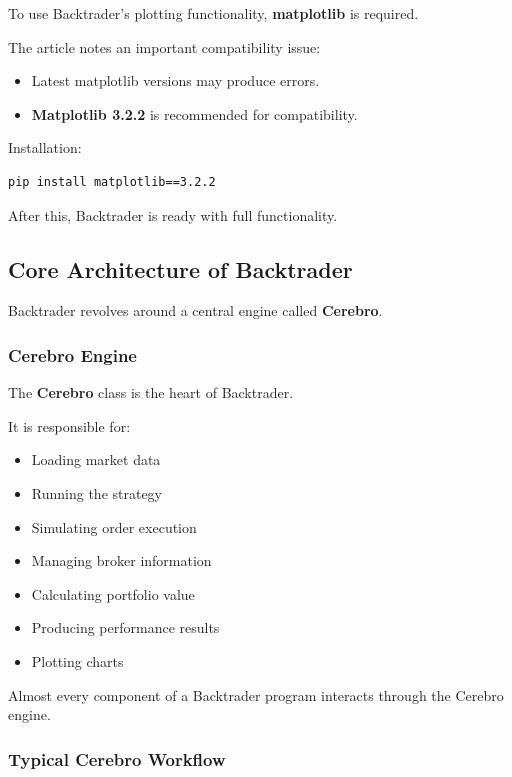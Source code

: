 \documentclass[12pt,openany]{book}
\begin{document}
To use Backtrader's plotting functionality, \textbf{matplotlib} is required.

The article notes an important compatibility issue:

\begin{itemize}[leftmargin=*]
    \item Latest matplotlib versions may produce errors.
    \item \textbf{Matplotlib 3.2.2} is recommended for compatibility.
\end{itemize}

Installation:

\begin{Verbatim}[breaklines=true,breakanywhere=true,fontsize=\small]
pip install matplotlib==3.2.2
\end{Verbatim}

After this, Backtrader is ready with full functionality.

\subsection{Core Architecture of Backtrader}

Backtrader revolves around a central engine called \textbf{Cerebro}.

\subsubsection{Cerebro Engine}

The \textbf{Cerebro} class is the heart of Backtrader.

It is responsible for:

\begin{itemize}[leftmargin=*]
    \item Loading market data
    \item Running the strategy
    \item Simulating order execution
    \item Managing broker information
    \item Calculating portfolio value
    \item Producing performance results
    \item Plotting charts
\end{itemize}

Almost every component of a Backtrader program interacts through the Cerebro engine.

\subsubsection{Typical Cerebro Workflow}
\end{document}
